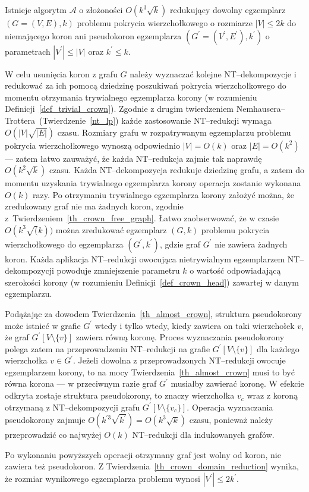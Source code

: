 {  \begin{theorem}
    Istnieje algorytm $\mathcal{A}$ o złożoności $O(k^3\sqrt{k})$ redukujący dowolny egzemplarz $(G=(V, E), k)$ problemu pokrycia wierzchołkowego o rozmiarze $|V|\leq 2k$ do niemającego koron ani pseudokoron egzemplarza $(G^\prime=(V^\prime, E^\prime), k^\prime)$ o parametrach $|V^\prime| \leq |V|$ oraz $k^\prime \leq k$.
  \end{theorem}
  \begin{bproof}
    W celu usunięcia koron z grafu $G$ należy wyznaczać kolejne NT--dekompozycje i redukować za ich pomocą dziedzinę poszukiwań pokrycia wierzchołkowego do momentu otrzymania trywialnego egzemplarza korony (w rozumieniu Definicji~\ref{def_trivial_crown}).
    Zgodnie z drugim twierdzeniem Nemhausera--Trottera~(Twierdzenie~\ref{nt_lp}) każde zastosowanie NT--redukcji wymaga $O(|V|\sqrt{|E|})$ czasu.
    Rozmiary grafu w rozpatrywanym egzemplarzu problemu pokrycia wierzchołkowego wynoszą odpowiednio $|V|=O(k)$ oraz $|E|=O(k^2)$ --- zatem łatwo zauważyć, że każda NT--redukcja zajmie tak naprawdę $O(k^2\sqrt{k})$ czasu.
    Każda NT--dekompozycja redukuje dziedzinę grafu, a zatem do momentu uzyskania trywialnego egzemplarza korony operacja zostanie wykonana $O(k)$ razy.
    Po otrzymaniu trywialnego egzemplarza korony założyć można, że zredukowany graf nie ma żadnych koron, zgodnie z~Twierdzeniem~\ref{th_crown_free_graph}.
    Łatwo zaobserwować, że w czasie $O(k^3\sqrt(k))$ można zredukować egzemplarz $(G, k)$ problemu pokrycia wierzchołkowego do egzemplarza $(G^\prime, k^\prime)$, gdzie graf $G^\prime$ nie zawiera żadnych koron.
    Każda aplikacja NT--redukcji owocująca nietrywialnym egzemplarzem NT--dekompozycji powoduje zmniejszenie parametru $k$ o wartość odpowiadającą szerokości korony (w rozumieniu Definicji~\ref{def_crown_head}) zawartej w danym egzemplarzu.

    Podążając za dowodem Twierdzenia~\ref{th_almost_crown}, struktura pseudokorony może istnieć w grafie $G^\prime$ wtedy i tylko wtedy, kiedy zawiera on taki wierzchołek $v$, że graf $G^\prime[V \setminus \{v\}]$ zawiera równą koronę.
    Proces wyznaczania pseudokorony polega zatem na przeprowadzeniu NT--redukcji na grafie $G^\prime[V \setminus \{v\}]$ dla każdego wierzchołka $v \in G^\prime$.
    Jeżeli dowolna z przeprowadzonych NT--redukcji owocuje egzemplarzem korony, to na mocy Twierdzenia~\ref{th_almost_crown} musi to być równa korona --- w przeciwnym razie graf $G^\prime$ musiałby zawierać koronę.
    W efekcie odkryta zostaje struktura pseudokorony, to znaczy wierzchołka $v_c$ wraz z koroną otrzymaną z NT--dekompozycji grafu $G^\prime[V \setminus \{v_c\}]$.
    Operacja wyznaczania pseudokorony zajmuje $O(k^{\prime3}\sqrt{k^\prime})=O(k^3\sqrt{k})$ czasu, ponieważ należy przeprowadzić co najwyżej $O(k)$ NT--redukcji dla indukowanych grafów.

    Po wykonaniu powyższych operacji otrzymany graf jest wolny od koron, nie zawiera też pseudokoron.
    Z Twierdzenia~\ref{th_crown_domain_reduction} wynika, że rozmiar wynikowego egzemplarza problemu wynosi $|V^\prime| \leq 2k^\prime$.
  \end{bproof}
}
